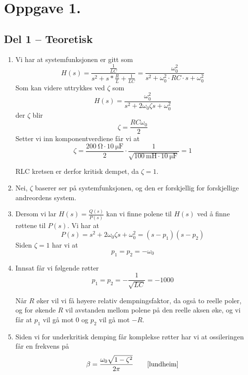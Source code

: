 \documentclass[a4paper,11pt,norsk]{article}
\newcommand{\nobibparens}[1]{\unskip\cite{#1}}
\begin{document}


\section*{Oppgave 1.}
\subsection*{Del 1 -- Teoretisk}
\begin{enumerate}
\item Vi har at systemfunksjonen er gitt som
    \[
        H(s) = \frac{\frac{1}{LC}}{s^2 + s * \frac{R}{L} + \frac{1}{LC}} = \frac{\omega_0^2}{s^2 + \omega_0 ^2 \cdot RC \cdot s + \omega_0^2}
    \]
    Som kan videre uttrykkes ved $\zeta$ som
    \[
        H(s) = \frac{\omega_0^2}{s^2 + 2 \omega_0 \zeta s + \omega_0^2}
    \]
    der $\zeta$ blir
    \[
        \zeta = \frac{RC \omega_0}{2}
    \]
    Setter vi inn komponentverdiene får vi at 
    \[
        \zeta = \frac{\SI{200}{\ohm} \cdot \SI{10}{\micro\farad}}{2} \cdot \frac{1}{\sqrt{\SI{100}{\milli\henry} \cdot \SI{10}{\micro\farad}}} = 1
    \]

    RLC kretsen er derfor kritisk dempet, da $\zeta = 1$.

\item Nei, $\zeta$ baserer ser på systemfunksjonen, og den er forskjellig for forskjellige andreordens system.

\item Dersom vi lar $H(s) = \frac{Q(s)}{P(s)}$ kan vi finne polene til $H(s)$ ved å finne røttene til $P(s)$.
    Vi har at 
    \[
        P(s) = s^2 + 2 \omega_0 \zeta s + \omega_0^2 = (s - p_1)(s - p_2)
    \]
    Siden $\zeta = 1$ har vi at 
    \[
        p_1 = p_2 = -\omega_0
    \]

\item Innsat får vi følgende røtter
    \[
        p_1 = p_2 = -\frac{1}{\sqrt{LC}} = -1000
    \]

    Når $R$ øker vil vi få høyere relativ dempningsfaktor, da også to reelle poler, 
    og for økende $R$ vil avstanden mellom polene på den reelle aksen øke, og vi får at $p_1$ vil gå mot 0 og
    $p_2$ vil gå mot $-R$.

\item Siden vi for underkritisk demping får komplekse røtter har vi at 
    ossileringen får en frekvens på 
    \begin{equation*}
        \beta = \frac{\omega_0 \sqrt{1 - \zeta^2}}{2\pi} \tag*{\nobibparens{lundheim}}
    \end{equation*}
\end{enumerate}
\end{document}
